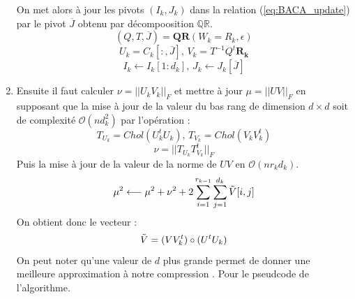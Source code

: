 \documentclass[10pt]{SelfArx} %
\begin{document}
\begin{enumerate}[noitemsep]
    On met alors à jour les pivots $(I_k,J_k)$ dans la relation (\ref{eq:BACA_update}) par le pivot $\overline{J}$ obtenu par décompoosition $\mathbb{QR}$.
    \begin{equation}
        (Q,T,\overline{J})=\mathbf{QR}(W_k=R_{k},\epsilon)
    \end{equation}
    \begin{equation}
        U_k=C_k[:,\overline{J}], \, V_k=T^{-1}Q^t\mathbf{R_k}
    \end{equation}
    \begin{equation}
        I_k \longleftarrow I_k[1:d_k], \, J_k \longleftarrow J_k[\overline{J}]
        \label{eq:BACA_update}
    \end{equation}
    \item Ensuite il faut calculer $\nu=||U_kV_k||_F$ et mettre à jour $\mu=||UV||_F$ en supposant que la mise à jour de la valeur du bas rang de dimension $d \times d$ soit de complexité $\mathcal{O}(nd_k^2)$ par l'opération :
    \begin{equation}
        T_{U_k}= Chol(U_k^t U_k), \, T_{V_k}=Chol(V_k V_k^t)
    \end{equation}
    \begin{equation}
        \nu = || T_{U_k} T_{V_k}^t||_F
    \end{equation}
    Puis la mise à jour de la valeur de la norme de $UV$ en $\mathcal{O}(n r_k d_k)$.
    \begin{equation}
        \mu^2 \longleftarrow \mu^2+\nu^2+2\sum_{i=1}^{r_{k-1}} \sum_{j=1}^{d_k} \Tilde{V}[i,j]
    \end{equation}
    On obtient donc le vecteur :
    \begin{equation}
        \Tilde{V}=(V V_k^t) \circ (U^tU_k)
    \end{equation}
    On peut noter qu'une valeur de $d$ plus grande permet de donner une meilleure approximation à notre compression \cite{liu_parallel_2020}. Pour le pseudcode de l'algorithme.
\end{enumerate}
\end{document}
